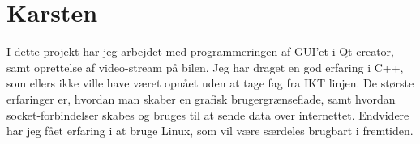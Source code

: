 \section{Karsten}
I dette projekt har jeg arbejdet med programmeringen af GUI'et i Qt-creator, samt oprettelse af video-stream på bilen. 
Jeg har draget en god erfaring i C++, som ellers ikke ville have været opnået uden at tage fag fra IKT linjen. 
De største erfaringer er, hvordan man skaber en grafisk brugergrænseflade, samt hvordan socket-forbindelser skabes og bruges til at sende data over internettet. 
Endvidere har jeg fået erfaring i at bruge Linux, som vil være særdeles brugbart i fremtiden.  